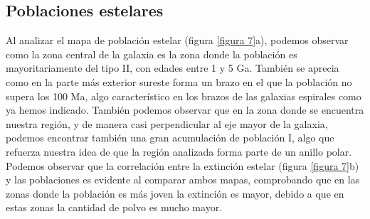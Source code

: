 \documentclass{article}
\begin{document}
\subsection{Poblaciones estelares}
Al analizar el mapa de población estelar (figura \ref{figura 7}a), podemos observar como la zona central de la galaxia es la zona donde la población es mayoritariamente del tipo II, con edades entre 1 y 5 Ga. También se aprecia como en la parte más exterior sureste forma un brazo en el que la población no supera los 100 Ma, algo característico en los brazos de las galaxias espirales como ya hemos indicado. También podemos observar que en la zona donde se encuentra nuestra región, y de manera casi perpendicular al eje mayor de la galaxia, podemos encontrar también una gran acumulación de población I, algo que refuerza nuestra idea de que la región analizada forma parte de un anillo polar.\\Podemos observar que la correlación entre la extinción estelar (figura \ref{figura 7}b) y las poblaciones es evidente al comparar ambos mapas, comprobando que en las zonas donde la población es más joven la extinción es mayor, debido a que en estas zonas la cantidad de polvo es mucho mayor.
\end{document}
